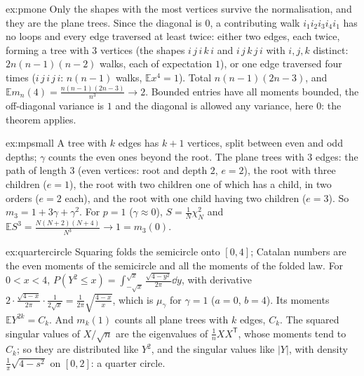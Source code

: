 \begin{solution}{ex:pmone}
\idea Only the shapes with the most vertices survive the normalisation, and they are the plane trees.
\writeup Since the diagonal is $0$, a contributing walk $i_1i_2i_3i_4i_1$ has no loops and every edge traversed at least twice: either two edges, each twice, forming a tree with $3$ vertices (the shapes $i\,j\,i\,k\,i$ and $i\,j\,k\,j\,i$
with $i,j,k$ distinct: $2n(n-1)(n-2)$ walks, each of expectation $1$), or one edge traversed four times ($i\,j\,i\,j\,i$: $n(n-1)$ walks, $\mathbb Ex^4=1$). Total $n(n-1)(2n-3)$, and $\mathbb Em_n(4)=\frac{n(n-1)(2n-3)}{n^3}\to2$.
Bounded entries have all moments bounded, the off-diagonal variance is $1$ and the diagonal is allowed any variance, here $0$: the theorem applies.
\end{solution}

\begin{solution}{ex:mpsmall}
\idea A tree with $k$ edges has $k+1$ vertices, split between even and odd depths; $\gamma$ counts the even ones beyond the root.
\writeup The plane trees with $3$ edges: the path of length $3$ (even vertices: root and depth $2$, $e=2$), the root with three children ($e=1$), the root with two children one of which has a child, in two orders ($e=2$ each), and
the root with one child having two children ($e=3$). So $m_3=1+3\gamma+\gamma^2$. For $p=1$ ($\gamma\approx0$), $S=\frac1N\chi^2_N$ and $\mathbb ES^3=\frac{N(N+2)(N+4)}{N^3}\to1=m_3(0)$.
\end{solution}

\begin{solution}{ex:quartercircle}
\idea Squaring folds the semicircle onto $[0,4]$; Catalan numbers are the even moments of the semicircle and all the moments of the folded law.
\writeup For $0<x<4$, $P(Y^2\le x)=\int_{-\sqrt x}^{\sqrt x}\frac{\sqrt{4-y^2}}{2\pi}\dd y$, with derivative $2\cdot\frac{\sqrt{4-x}}{2\pi}\cdot\frac1{2\sqrt x}=\frac1{2\pi}\sqrt{\frac{4-x}x}$, which is $\mu_\gamma$ for $\gamma=1$ ($a=0$, $b=4$). Its moments
$\mathbb EY^{2k}=C_k$. And $m_k(1)$ counts all plane trees with $k$ edges, $C_k$. The squared singular values of $X/\sqrt n$ are the eigenvalues of $\frac1nXX^{\mathsf T}$, whose moments tend to $C_k$; so they are distributed like
$Y^2$, and the singular values like $|Y|$, with density $\frac1\pi\sqrt{4-s^2}$ on $[0,2]$: a quarter circle.
\end{solution}

